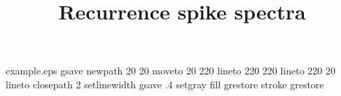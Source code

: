 %
%
%
%
%
\begin{filecontents*}{example.eps}
gsave
newpath
  20 20 moveto
  20 220 lineto
  220 220 lineto
  220 20 lineto
closepath
2 setlinewidth
gsave
  .4 setgray fill
grestore
stroke
grestore
\end{filecontents*}
%
\RequirePackage{fix-cm}
%
\documentclass[smallcondensed]{svjour3}    %

%
\smartqed  %
%
\usepackage{graphicx}
%
%
\usepackage{dcolumn}%
\usepackage{bm}%
\setlength{\marginparwidth}{2cm}
\usepackage{changes}
\usepackage{bbm}
\usepackage[utf8]{inputenc}
\usepackage[T1]{fontenc}
\usepackage{mathptmx}
\usepackage{amsmath}
\usepackage{amssymb}
\usepackage{statmath}
\usepackage[numbers]{natbib}
\usepackage{hyperref}
\usepackage{enumitem}
\usepackage{mathtools}
\DeclarePairedDelimiter\ceil{\lceil}{\rceil}
%
%
%


\title{Recurrence spike spectra}


